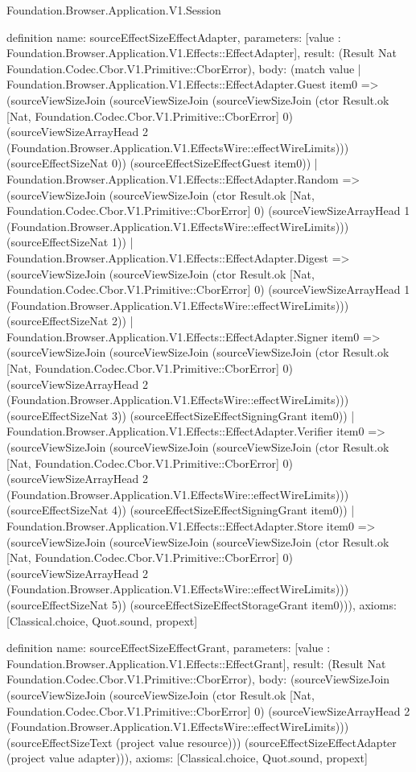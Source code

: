 \begin{lexlean}{Foundation.Browser.Application.V1.Session}
\begin{semanticmodule}
definition{
  name: sourceEffectSizeEffectAdapter,
  parameters: [value : Foundation.Browser.Application.V1.Effects::EffectAdapter],
  result: (Result Nat Foundation.Codec.Cbor.V1.Primitive::CborError),
  body: (match value
    | Foundation.Browser.Application.V1.Effects::EffectAdapter.Guest item0 => (sourceViewSizeJoin (sourceViewSizeJoin (sourceViewSizeJoin (ctor Result.ok [Nat, Foundation.Codec.Cbor.V1.Primitive::CborError] 0) (sourceViewSizeArrayHead 2 (Foundation.Browser.Application.V1.EffectsWire::effectWireLimits))) (sourceEffectSizeNat 0)) (sourceEffectSizeEffectGuest item0))
    | Foundation.Browser.Application.V1.Effects::EffectAdapter.Random => (sourceViewSizeJoin (sourceViewSizeJoin (ctor Result.ok [Nat, Foundation.Codec.Cbor.V1.Primitive::CborError] 0) (sourceViewSizeArrayHead 1 (Foundation.Browser.Application.V1.EffectsWire::effectWireLimits))) (sourceEffectSizeNat 1))
    | Foundation.Browser.Application.V1.Effects::EffectAdapter.Digest => (sourceViewSizeJoin (sourceViewSizeJoin (ctor Result.ok [Nat, Foundation.Codec.Cbor.V1.Primitive::CborError] 0) (sourceViewSizeArrayHead 1 (Foundation.Browser.Application.V1.EffectsWire::effectWireLimits))) (sourceEffectSizeNat 2))
    | Foundation.Browser.Application.V1.Effects::EffectAdapter.Signer item0 => (sourceViewSizeJoin (sourceViewSizeJoin (sourceViewSizeJoin (ctor Result.ok [Nat, Foundation.Codec.Cbor.V1.Primitive::CborError] 0) (sourceViewSizeArrayHead 2 (Foundation.Browser.Application.V1.EffectsWire::effectWireLimits))) (sourceEffectSizeNat 3)) (sourceEffectSizeEffectSigningGrant item0))
    | Foundation.Browser.Application.V1.Effects::EffectAdapter.Verifier item0 => (sourceViewSizeJoin (sourceViewSizeJoin (sourceViewSizeJoin (ctor Result.ok [Nat, Foundation.Codec.Cbor.V1.Primitive::CborError] 0) (sourceViewSizeArrayHead 2 (Foundation.Browser.Application.V1.EffectsWire::effectWireLimits))) (sourceEffectSizeNat 4)) (sourceEffectSizeEffectSigningGrant item0))
    | Foundation.Browser.Application.V1.Effects::EffectAdapter.Store item0 => (sourceViewSizeJoin (sourceViewSizeJoin (sourceViewSizeJoin (ctor Result.ok [Nat, Foundation.Codec.Cbor.V1.Primitive::CborError] 0) (sourceViewSizeArrayHead 2 (Foundation.Browser.Application.V1.EffectsWire::effectWireLimits))) (sourceEffectSizeNat 5)) (sourceEffectSizeEffectStorageGrant item0))),
  axioms: [Classical.choice, Quot.sound, propext]
}

definition{
  name: sourceEffectSizeEffectGrant,
  parameters: [value : Foundation.Browser.Application.V1.Effects::EffectGrant],
  result: (Result Nat Foundation.Codec.Cbor.V1.Primitive::CborError),
  body: (sourceViewSizeJoin (sourceViewSizeJoin (sourceViewSizeJoin (ctor Result.ok [Nat, Foundation.Codec.Cbor.V1.Primitive::CborError] 0) (sourceViewSizeArrayHead 2 (Foundation.Browser.Application.V1.EffectsWire::effectWireLimits))) (sourceEffectSizeText (project value resource))) (sourceEffectSizeEffectAdapter (project value adapter))),
  axioms: [Classical.choice, Quot.sound, propext]
}


\end{semanticmodule}
\end{lexlean}
